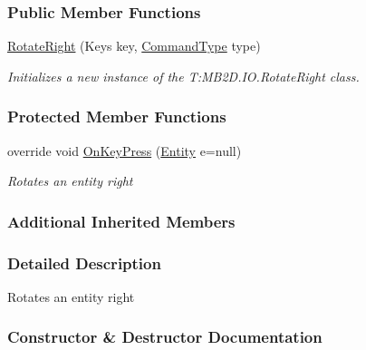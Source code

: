 \subsubsection*{Public Member Functions}
\begin{DoxyCompactItemize}
\item 
\hyperlink{class_m_b2_d_1_1_i_o_1_1_rotate_right_a63834f16dd32f6be7fe9408f177c26e1}{Rotate\+Right} (Keys key, \hyperlink{namespace_m_b2_d_1_1_i_o_ab5f95f3fe9e652778b62bdf943168a68}{Command\+Type} type)
\begin{DoxyCompactList}\small\item\em Initializes a new instance of the T\+:\+M\+B2\+D.\+I\+O.\+Rotate\+Right class. \end{DoxyCompactList}\end{DoxyCompactItemize}
\subsubsection*{Protected Member Functions}
\begin{DoxyCompactItemize}
\item 
override void \hyperlink{class_m_b2_d_1_1_i_o_1_1_rotate_right_a416106025812db523b009155d462cb6b}{On\+Key\+Press} (\hyperlink{class_m_b2_d_1_1_entity_component_1_1_entity}{Entity} e=null)
\begin{DoxyCompactList}\small\item\em Rotates an entity right \end{DoxyCompactList}\end{DoxyCompactItemize}
\subsubsection*{Additional Inherited Members}


\subsubsection{Detailed Description}
Rotates an entity right 



\subsubsection{Constructor \& Destructor Documentation}
\hypertarget{class_m_b2_d_1_1_i_o_1_1_rotate_right_a63834f16dd32f6be7fe9408f177c26e1}{}\label{class_m_b2_d_1_1_i_o_1_1_rotate_right_a63834f16dd32f6be7fe9408f177c26e1} 
